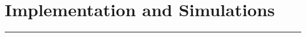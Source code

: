 \section{Implementation and Simulations}
\noindent\rule{\textwidth}{1pt}

\begin{multicols}{2}
    
    
    \columnbreak
    
    
\end{multicols}
